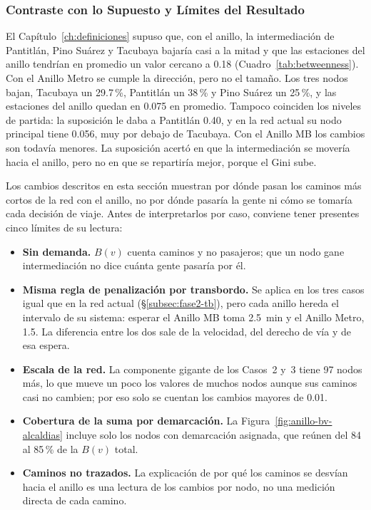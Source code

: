 \subsubsection{Contraste con lo Supuesto y Límites del Resultado}

El Capítulo~\ref{ch:definiciones} supuso que, con el anillo, la intermediación
de Pantitlán, Pino Suárez y Tacubaya bajaría casi a la mitad y que las
estaciones del anillo tendrían en promedio un valor cercano a 0.18
(Cuadro~\ref{tab:betweenness}). Con el Anillo Metro se cumple la dirección,
pero no el tamaño. Los tres nodos bajan, Tacubaya un 29.7\,\%, Pantitlán un
38\,\% y Pino Suárez un 25\,\%, y las estaciones del anillo quedan en 0.075 en
promedio. Tampoco coinciden los niveles de partida: la suposición le daba a
Pantitlán 0.40, y en la red actual su nodo principal tiene 0.056, muy por debajo
de Tacubaya. Con el Anillo MB los cambios son todavía menores. La suposición
acertó en que la intermediación se movería hacia el anillo, pero no en que se
repartiría mejor, porque el Gini sube.

Los cambios descritos en esta sección muestran por dónde pasan los caminos más
cortos de la red con el anillo, no por dónde pasaría la gente ni cómo se
tomaría cada decisión de viaje. Antes de interpretarlos por caso, conviene
tener presentes cinco límites de su lectura:

\begin{itemize}
    \item \textbf{Sin demanda.} $B(v)$ cuenta caminos y no pasajeros; que un
    nodo gane intermediación no dice cuánta gente pasaría por él.
    \item \textbf{Misma regla de penalización por transbordo.} Se aplica en los
    tres casos igual que en la red actual (§\ref{subsec:fase2-tb}), pero cada
    anillo hereda el intervalo de su sistema: esperar el Anillo MB toma 2.5~min y
    el Anillo Metro, 1.5. La diferencia entre los dos sale de la velocidad, del
    derecho de vía y de esa espera.
    \item \textbf{Escala de la red.} La componente gigante de los Casos~2 y~3
    tiene 97 nodos más, lo que mueve un poco los valores de muchos nodos
    aunque sus caminos casi no cambien; por eso solo se cuentan los cambios
    mayores de 0.01.
    \item \textbf{Cobertura de la suma por demarcación.} La
    Figura~\ref{fig:anillo-bv-alcaldias} incluye solo los nodos con
    demarcación asignada, que reúnen del 84 al 85\,\% de la $B(v)$ total.
    \item \textbf{Caminos no trazados.} La explicación de por qué los caminos
    se desvían hacia el anillo es una lectura de los cambios por nodo, no
    una medición directa de cada camino.
\end{itemize}

